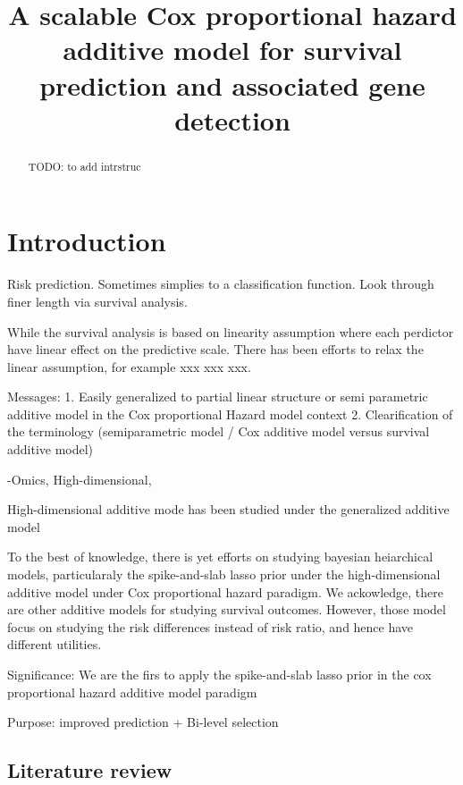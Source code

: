 \documentclass{article}
\title{A scalable Cox proportional hazard additive model for survival
prediction and associated gene detection}
\author{
  }
\begin{document}
\maketitle

\def\tightlist{}


\begin{abstract}
TODO: to add intrstruc
\end{abstract}


\hypertarget{introduction}{%
\section{Introduction}\label{introduction}}

Risk prediction. Sometimes simplies to a classification function. Look
through finer length via survival analysis.

While the survival analysis is based on linearity assumption where each
perdictor have linear effect on the predictive scale. There has been
efforts to relax the linear assumption, for example xxx xxx xxx.

Messages: 1. Easily generalized to partial linear structure or semi
parametric additive model in the Cox proportional Hazard model context
2. Clearification of the terminology (semiparametric model / Cox
additive model versus survival additive model)

-Omics, High-dimensional,

High-dimensional additive mode has been studied under the generalized
additive model

To the best of knowledge, there is yet efforts on studying bayesian
heiarchical models, particularaly the spike-and-slab lasso prior under
the high-dimensional additive model under Cox proportional hazard
paradigm. We ackowledge, there are other additive models for studying
survival outcomes. However, those model focus on studying the risk
differences instead of risk ratio, and hence have different utilities.

Significance: We are the firs to apply the spike-and-slab lasso prior in
the cox proportional hazard additive model paradigm

Purpose: improved prediction + Bi-level selection

\hypertarget{literature-review}{%
\subsection{Literature review}\label{literature-review}}
\end{document}
